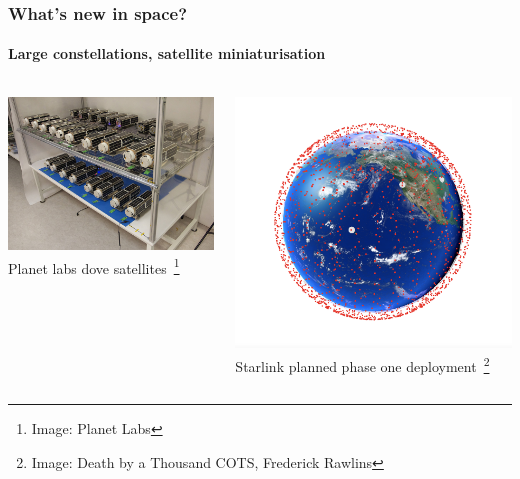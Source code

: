 \documentclass{beamer}
\begin{document}
\begin{frame}
  \frametitle{What's new in space?}
  \framesubtitle{Large constellations, satellite miniaturisation}
  \begin{columns}[t]
    \begin{column}{5cm}
      \centering
      \includegraphics[width=\columnwidth]{images/planetlabs_satellites.jpg}
      \newline
      Planet labs dove satellites~\footnote[frame]{Image: Planet Labs}
    \end{column}

    \begin{column}{5cm}
      \centering
      \includegraphics[width=\columnwidth]{images/starlinkphase1.png}
      \newline
      Starlink planned phase one deployment~\footnote[frame]{Image: Death by a Thousand COTS, Frederick Rawlins}
    \end{column}
  \end{columns}
\end{frame}
\end{document}
